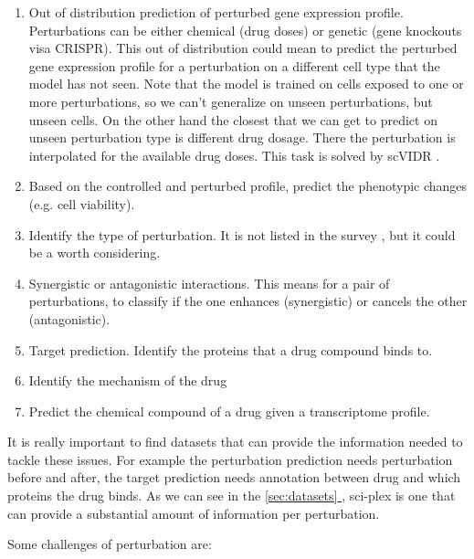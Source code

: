 \documentclass[12pt, a4paper]{article}
\newcommand*{\fullref}[1]{\hyperref[{#1}]{\ref*{#1} \nameref*{#1}}}
\begin{document}
\begin{enumerate}
  \itemsep -0.1em
  \item Out of distribution prediction of perturbed gene expression profile. Perturbations can be either chemical (drug doses) or genetic (gene knockouts visa CRISPR). This out of distribution could mean to predict the perturbed gene expression profile for a perturbation on a different cell type that the model has not seen. Note that the model is trained on cells exposed to one or more perturbations, so we can't generalize on unseen perturbations, but unseen cells. On the other hand the closest that we can get to predict on unseen perturbation type is different drug dosage. There the perturbation is interpolated for the available drug doses. This task is solved by scVIDR \cite{kanaGenerativeModelingSinglecell2023}.
  \item Based on the controlled and perturbed profile, predict the phenotypic changes (e.g. cell viability).
  \item Identify the type of perturbation. It is not listed in the survey \cite{gavriilidisMinireviewPerturbationModelling2024}, but it could be a worth considering.
  \item Synergistic or antagonistic interactions. This means for a pair of perturbations, to classify if the one enhances (synergistic) or cancels the other (antagonistic).
  \item Target prediction. Identify the proteins that a drug compound binds to.
  \item Identify the mechanism of the drug
  \item Predict the chemical compound of a drug given a transcriptome profile.
\end{enumerate}

It is really important to find datasets that can provide the information needed to tackle these issues. For example the perturbation prediction needs perturbation before and after, the target prediction needs annotation between drug and which proteins the drug binds. As we can see in the \fullref{sec:datasets}, sci-plex is one that can provide a substantial amount of information per perturbation.

Some challenges of perturbation are:
\end{document}
